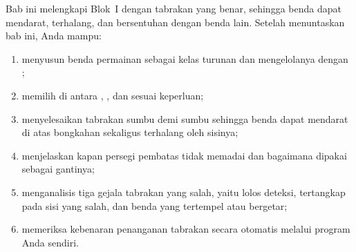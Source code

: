 \begin{tujuanbox}
Bab ini melengkapi Blok~I dengan tabrakan yang benar, sehingga benda dapat
mendarat, terhalang, dan bersentuhan dengan benda lain. Setelah menuntaskan
bab ini, Anda mampu:
\begin{enumerate}
  \item menyusun benda permainan sebagai kelas turunan
         dan mengelolanya dengan
        ;
  \item memilih di antara , , dan
         sesuai keperluan;
  \item menyelesaikan tabrakan sumbu demi sumbu sehingga benda dapat mendarat
        di atas bongkahan sekaligus terhalang oleh sisinya;
  \item menjelaskan kapan persegi pembatas tidak memadai dan bagaimana
         dipakai sebagai gantinya;
  \item menganalisis tiga gejala tabrakan yang salah, yaitu lolos deteksi,
        tertangkap pada sisi yang salah, dan benda yang tertempel atau
        bergetar;
  \item memeriksa kebenaran penanganan tabrakan secara otomatis melalui
        program Anda sendiri.
\end{enumerate}
\end{tujuanbox}
